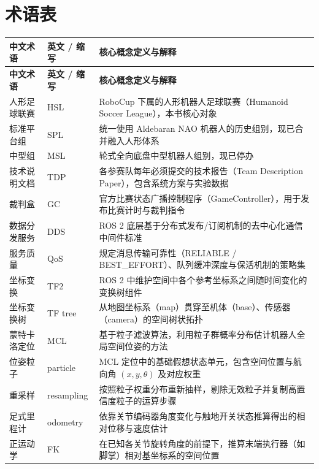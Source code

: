\appendix
\section{术语表}

\begin{longtable}{p{2.6cm} p{4.2cm} p{7.4cm}}
\toprule
\textbf{中文术语} & \textbf{英文 / 缩写} & \textbf{核心概念定义与解释} \\
\midrule
\endfirsthead
\toprule
\textbf{中文术语} & \textbf{英文 / 缩写} & \textbf{核心概念定义与解释} \\
\midrule
\endhead
\bottomrule
\endfoot
人形足球联赛 & HSL & RoboCup 下属的人形机器人足球联赛（Humanoid Soccer League），本书核心对象 \\
\addlinespace
标准平台组 & SPL & 统一使用 Aldebaran NAO 机器人的历史组别，现已合并融入人形体系 \\
\addlinespace
中型组 & MSL & 轮式全向底盘中型机器人组别，现已停办 \\
\addlinespace
技术说明文档 & TDP & 各参赛队每年必须提交的技术报告（Team Description Paper），包含系统方案与实验数据 \\
\addlinespace
裁判盒 & GC & 官方比赛状态广播控制程序（GameController），用于发布比赛计时与裁判指令 \\
\addlinespace
数据分发服务 & DDS & ROS 2 底层基于分布式发布/订阅机制的去中心化通信中间件标准 \\
\addlinespace
服务质量 & QoS & 规定消息传输可靠性（RELIABLE / BEST\_EFFORT）、队列缓冲深度与保活机制的策略集 \\
\addlinespace
坐标变换 & TF2 & ROS 2 中维护空间中各个参考坐标系之间随时间变化的变换树组件 \\
\addlinespace
坐标变换树 & TF tree & 从地图坐标系（map）贯穿至机体（base）、传感器（camera）的空间树状拓扑 \\
\addlinespace
蒙特卡洛定位 & MCL & 基于粒子滤波算法，利用粒子群概率分布估计机器人全局空间位姿的方法 \\
\addlinespace
位姿粒子 & particle & MCL 定位中的基础假想状态单元，包含空间位置与航向角 $(x, y, \theta)$ 及对应权重 \\
\addlinespace
重采样 & resampling & 按照粒子权重分布重新抽样，剔除无效粒子并复制高置信度粒子的运算步骤 \\
\addlinespace
足式里程计 & odometry & 依靠关节编码器角度变化与触地开关状态推算得出的相对位移与速度估计 \\
\addlinespace
正运动学 & FK & 在已知各关节旋转角度的前提下，推算末端执行器（如脚掌）相对基坐标系的空间位置 \\

\end{longtable}
